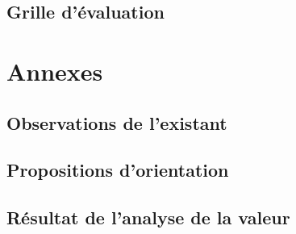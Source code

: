 \subsection{Grille d'évaluation}

\section{Annexes}

\subsection{Observations de l'existant}

\subsection{Propositions d'orientation}


\subsection{Résultat de l'analyse de la valeur}